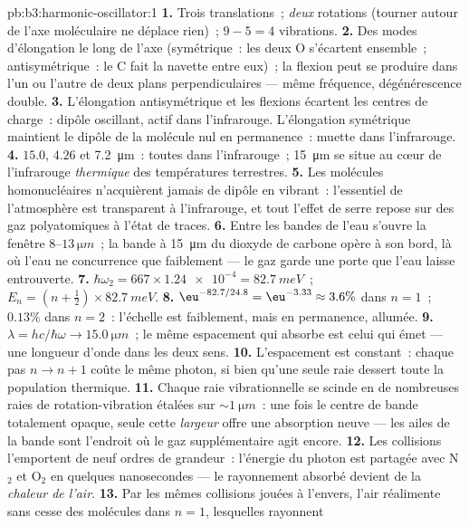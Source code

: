 \begin{solution}{pb:b3:harmonic-oscillator:1}
\textbf{1.} Trois translations~; \emph{deux} rotations (tourner autour
de l'axe moléculaire ne déplace rien)~; $9 - 5 = 4$ vibrations.
\textbf{2.} Des modes d'élongation le long de l'axe (symétrique~: les
deux O s'écartent ensemble~; antisymétrique~: le C fait la navette
entre eux)~; la flexion peut se produire dans l'un ou l'autre de deux
plans perpendiculaires --- même fréquence, dégénérescence double.
\textbf{3.} L'élongation antisymétrique et les flexions écartent les
centres de charge~: dipôle oscillant, actif dans l'infrarouge.
L'élongation symétrique maintient le dipôle de la molécule nul en
permanence~: muette dans l'infrarouge.
\textbf{4.} $15.0$, $4.26$ et \qty{7.2}{\micro m}~: toutes dans
l'infrarouge~; \qty{15}{\micro m} se situe au cœur de l'infrarouge
\emph{thermique} des températures terrestres.
\textbf{5.} Les molécules homonucléaires n'acquièrent jamais de dipôle
en vibrant~: l'essentiel de l'atmosphère est transparent à
l'infrarouge, et tout l'effet de serre repose sur des gaz
polyatomiques à l'état de traces.
\textbf{6.} Entre les bandes de l'eau s'ouvre la fenêtre
$8$--$13\,\unit{\micro m}$~; la bande à \qty{15}{\micro m} du dioxyde
de carbone opère à son bord, là où l'eau ne concurrence que faiblement
--- le gaz garde une porte que l'eau laisse entrouverte.
\textbf{7.} $\hbar\omega_2 = 667 \times \num{1.24e-4} =
\qty{82.7}{meV}$~; $E_n = (n + \tfrac12) \times \qty{82.7}{meV}$.
\textbf{8.} $\eu^{-82.7/24.8} = \eu^{-3.33} \approx 3.6\%$ dans $n =
1$~; $0.13\%$ dans $n = 2$~: l'échelle est faiblement, mais en
permanence, allumée.
\textbf{9.} $\lambda = hc/\hbar\omega \to \qty{15.0}{\micro m}$~; le
même espacement qui absorbe est celui qui émet --- une longueur d'onde
dans les deux sens.
\textbf{10.} L'espacement est constant~: chaque pas $n \to n + 1$
coûte le même photon, si bien qu'une seule raie dessert toute la
population thermique.
\textbf{11.} Chaque raie vibrationnelle se scinde en de nombreuses
raies de rotation-vibration étalées sur $\sim\qty{1}{\micro m}$~:
une fois le centre de bande totalement opaque, seule cette
\emph{largeur} offre une absorption neuve --- les ailes de la bande
sont l'endroit où le gaz supplémentaire agit encore.
\textbf{12.} Les collisions l'emportent de neuf ordres de grandeur~:
l'énergie du photon est partagée avec N$_2$ et O$_2$ en quelques
nanosecondes --- le rayonnement absorbé devient de la \emph{chaleur de
l'air}.
\textbf{13.} Par les mêmes collisions jouées à l'envers, l'air
réalimente sans cesse des molécules dans $n = 1$, lesquelles rayonnent

\end{solution}
